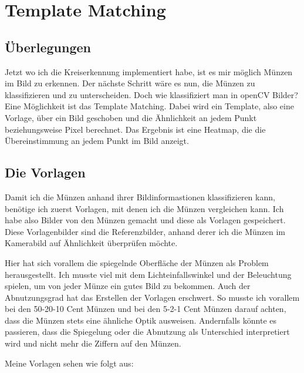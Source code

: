 \section{Template Matching}

\subsection{Überlegungen}
Jetzt wo ich die Kreiserkennung implementiert habe, ist es mir möglich Münzen im Bild zu erkennen. Der nächste Schritt wäre es nun, die Münzen zu klassifizieren und zu unterscheiden. Doch wie klassifiziert man in openCV Bilder? Eine Möglichkeit ist das Template Matching. Dabei wird ein Template, also eine Vorlage, über ein Bild geschoben und die Ähnlichkeit an jedem Punkt beziehungsweise Pixel berechnet. Das Ergebnis ist eine Heatmap, die die Übereinstimmung an jedem Punkt im Bild anzeigt.

\subsection{Die Vorlagen}
Damit ich die Münzen anhand ihrer Bildinformastionen klassifizieren kann, benötige ich zuerst Vorlagen, mit denen ich die Münzen vergleichen kann. Ich habe also Bilder von den Münzen gemacht und diese als Vorlagen gespeichert. Diese Vorlagenbilder sind die Referenzbilder, anhand derer ich die Münzen im Kamerabild auf Ähnlichkeit überprüfen möchte.

Hier hat sich vorallem die spiegelnde Oberfläche der Münzen als Problem herausgestellt. Ich musste viel mit dem Lichteinfallswinkel und der Beleuchtung spielen, um von jeder Münze ein gutes Bild zu bekommen. Auch der Abnutzungsgrad hat das Erstellen der Vorlagen erschwert. So musste ich vorallem bei den 50-20-10 Cent Münzen und bei den 5-2-1 Cent Münzen darauf achten, dass die Münzen stets eine ähnliche Optik ausweisen. Andernfalls könnte es passieren, dass die Spiegelung oder die Abnutzung als Unterschied interpretiert wird und nicht mehr die Ziffern auf den Münzen.

Meine Vorlagen sehen wie folgt aus:


